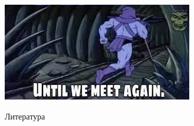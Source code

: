\documentclass[11pt,aspectratio=169]{beamer}
\begin{document}
\begin{frame}
\begin{center}
\includegraphics[scale=1.0]{images/bye.jpeg}
\end{center}
\end{frame}

\begin{frame}[allowframebreaks]{Литература}




\end{frame}
\end{document}
